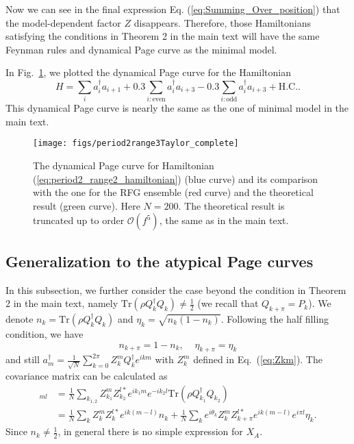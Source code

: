\documentclass[aps,onecolumn,nofootinbib,superscriptaddress,notitlepage,longbibliography]{revtex4-1}
\def \Tr {\mathrm{Tr}}
\begin{document}
 Now we can see in the final expression Eq. (\ref{eq:Summing_Over_position}) that the model-dependent factor %
$Z$ disappears. Therefore, those Hamiltonians
satisfying the conditions in %
Theorem 2 in the main text will have the same Feynman
rules and dynamical Page curve %
as the minimal model.


In Fig.~\ref{Taylor_completed_range3},
we plotted the dynamical Page curve for the Hamiltonian 
\begin{equation}
H=\sum_{i}a_{i}^{\dagger}a_{i+1}+0.3\sum_{i:\mathrm{even}}a_{i}^{\dagger}a_{i+3}-0.3\sum_{i:\mathrm{odd}}a_{i}^{\dagger}a_{i+3}+\mathrm{H.C.}.\label{eq:period2_range2_hamiltonian}
\end{equation}
This dynamical Page curve is nearly the same as the one of minimal
model in the main text.

\begin{figure}
\begin{center}
\texttt{[image: figs/period2range3Taylor\_complete]}

\caption{The dynamical Page curve for Hamiltonian (\ref{eq:period2_range2_hamiltonian})
(blue curve) and its comparison with the one for the RFG ensemble (red
curve) and the theoretical result (green curve). Here $N=200$. The
theoretical result is truncated up to order $\mathcal{O}(f^{5})$,
the same as in the main text. }

\label{Taylor_completed_range3}
\end{center}
\end{figure}

\subsection{Generalization to the %
atypical Page curves}

In this subsection, we %
further consider the case beyond the condition
in %
Theorem 2 in the main text, namely $\Tr(\rho Q_{k}^{\dagger}Q_{k})\neq\frac{1}{2}$
(we recall that $Q_{k+\pi}=P_{k}$). We denote $n_{k}=\Tr(\rho Q_{k}^{\dagger}Q_{k})$
and $\eta_{k}=\sqrt{n_{k}(1-n_{k})}$. Following the half filling condition,
we have 
\[
n_{k+\pi}=1-n_{k},\;\;\;\;\eta_{k+\pi}=\eta_{k}
\]
and still $a_{m}^{\dagger}=\frac{1}{\sqrt{N}}\sum_{k=0}^{2\pi}Z_{k}^{m}Q_{k}^{\dagger}e^{ikm}$
with $Z^m_{k}$ defined in Eq.~(\ref{eq:Zkm}). %
The covariance matrix
can be calculated as
\begin{align*}
[C_A]_{ml} & =\frac{1}{N}\sum_{k_{1,2}}Z_{k_{1}}^{m}Z_{k_{2}}^{l*}e^{ik_{1}m}e^{-ik_{2}l}\Tr(\rho Q_{k_{1}}^{\dagger}Q_{k_{2}})\\
 & =\frac{1}{N}\sum_{k}Z_{k}^{m}Z_{k}^{l*}e^{ik(m-l)}n_{k}+\frac{1}{N}\sum_{k}e^{i\theta_{k}}Z_{k}^{m}Z_{k+\pi}^{l*}e^{ik(m-l)}e^{i\pi l}\eta_{k}.
\end{align*}
Since $n_{k}\neq\frac{1}{2}$, in general there is no simple expression
for $X_{A}$. 
\end{document}
